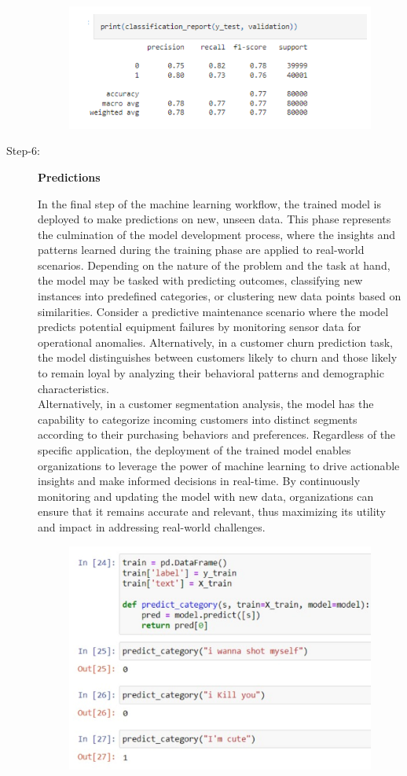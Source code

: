 \begin{description}
\begin{figure}[hbt!]
\end{figure}
 \begin{figure}[hbt!]
  \centering
 \includegraphics[width=0.8\linewidth]{C_chap/fig20.png}
\end{figure}
\pagebreak
\item[Step-6:] \textbf{Predictions}

In the final step of the machine learning workflow, the trained model is deployed to make predictions on new, unseen data. This phase represents the culmination of the model development process, where the insights and patterns learned during the training phase are applied to real-world scenarios. Depending on the nature of the problem and the task at hand, the model may be tasked with predicting outcomes, classifying new instances into predefined categories, or clustering new data points based on similarities. Consider a predictive maintenance scenario where the model predicts potential equipment failures by monitoring sensor data for operational anomalies. Alternatively, in a customer churn prediction task, the model distinguishes between customers likely to churn and those likely to remain loyal by analyzing their behavioral patterns and demographic characteristics.
\\
 Alternatively, in a customer segmentation analysis, the model has the capability to categorize incoming customers into distinct segments according to their purchasing behaviors and preferences. Regardless of the specific application, the deployment of the trained model enables organizations to leverage the power of machine learning to drive actionable insights and make informed decisions in real-time. By continuously monitoring and updating the model with new data, organizations can ensure that it remains accurate and relevant, thus maximizing its utility and impact in addressing real-world challenges.
 \begin{figure}[hbt!]
  \centering
 \includegraphics[width=0.8\linewidth]{C_chap/fig25.png}
\end{figure}



\end{description}
